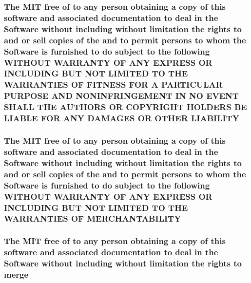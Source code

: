 \subsubsection[{L\+I\+A\+B\+I\+L\+I\+T\+Y}]{\setlength{\rightskip}{0pt plus 5cm}The M\+I\+T free of to any person obtaining a {\bf copy} of this software and associated documentation to deal in the {\bf Software} without including without limitation the rights to and or sell copies of the and to permit persons to whom the {\bf Software} is furnished to do subject to the following W\+I\+T\+H\+O\+U\+T W\+A\+R\+R\+A\+N\+T\+Y O\+F A\+N\+Y E\+X\+P\+R\+E\+S\+S O\+R I\+N\+C\+L\+U\+D\+I\+N\+G B\+U\+T N\+O\+T L\+I\+M\+I\+T\+E\+D T\+O T\+H\+E W\+A\+R\+R\+A\+N\+T\+I\+E\+S O\+F F\+I\+T\+N\+E\+S\+S F\+O\+R A P\+A\+R\+T\+I\+C\+U\+L\+A\+R P\+U\+R\+P\+O\+S\+E A\+N\+D N\+O\+N\+I\+N\+F\+R\+I\+N\+G\+E\+M\+E\+N\+T I\+N N\+O E\+V\+E\+N\+T S\+H\+A\+L\+L T\+H\+E A\+U\+T\+H\+O\+R\+S O\+R C\+O\+P\+Y\+R\+I\+G\+H\+T H\+O\+L\+D\+E\+R\+S B\+E L\+I\+A\+B\+L\+E F\+O\+R A\+N\+Y D\+A\+M\+A\+G\+E\+S O\+R O\+T\+H\+E\+R L\+I\+A\+B\+I\+L\+I\+T\+Y}\label{license_8txt_a154c0f6f925190567752588d1ff5458f}
\hypertarget{license_8txt_a82e4fcb28d3925b81ac5f50e2b22c270}{}
\subsubsection[{M\+E\+R\+C\+H\+A\+N\+T\+A\+B\+I\+L\+I\+T\+Y}]{\setlength{\rightskip}{0pt plus 5cm}The M\+I\+T free of to any person obtaining a {\bf copy} of this software and associated documentation to deal in the {\bf Software} without including without limitation the rights to and or sell copies of the and to permit persons to whom the {\bf Software} is furnished to do subject to the following W\+I\+T\+H\+O\+U\+T W\+A\+R\+R\+A\+N\+T\+Y O\+F A\+N\+Y E\+X\+P\+R\+E\+S\+S O\+R I\+N\+C\+L\+U\+D\+I\+N\+G B\+U\+T N\+O\+T L\+I\+M\+I\+T\+E\+D T\+O T\+H\+E W\+A\+R\+R\+A\+N\+T\+I\+E\+S O\+F M\+E\+R\+C\+H\+A\+N\+T\+A\+B\+I\+L\+I\+T\+Y}\label{license_8txt_a82e4fcb28d3925b81ac5f50e2b22c270}
\hypertarget{license_8txt_a7653d3ec339e97ccc64ec4f74e440441}{}
\subsubsection[{merge}]{\setlength{\rightskip}{0pt plus 5cm}The M\+I\+T free of to any person obtaining a {\bf copy} of this software and associated documentation to deal in the {\bf Software} without including without limitation the rights to merge}\label{license_8txt_a7653d3ec339e97ccc64ec4f74e440441}
\hypertarget{license_8txt_a4f5fee3fe655fc467fc80425521837ae}{}
